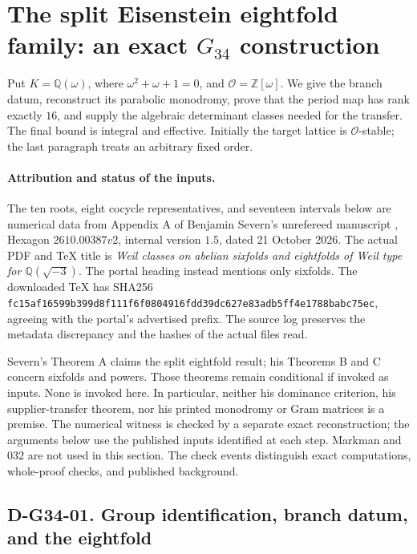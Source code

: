 \section{The split Eisenstein eightfold family: an exact \(G_{34}\) construction}
\label{sec:g34-new}

Put \(K=\mathbb Q(\omega)\), where \(\omega^2+\omega+1=0\), and
\(\mathcal O=\mathbb Z[\omega]\).  We give the branch datum, reconstruct its
parabolic monodromy, prove that the period map has rank exactly \(16\), and
supply the algebraic determinant classes needed for the transfer.  The final
bound is integral and effective.  Initially the target lattice is
\(\mathcal O\)-stable; the last paragraph treats an arbitrary fixed order.

\paragraph{Attribution and status of the inputs.}
The ten roots, eight cocycle representatives, and seventeen intervals below
are numerical data from Appendix A of Benjamin Severn's unrefereed manuscript
\cite{G34:Severn}, Hexagon \(2610.00387v2\), internal version \(1.5\), dated
21 October 2026.  The actual PDF and TeX title is \emph{Weil classes on abelian
sixfolds and eightfolds of Weil type for \(\mathbb Q(\sqrt{-3})\)}.  The portal
heading instead mentions only sixfolds.  The downloaded TeX has SHA256
\texttt{fc15af16599b399d8f111f6f0804916f}\allowbreak\texttt{dd39dc627e83adb5ff4e1788babc75ec},
agreeing with the portal's advertised prefix.  The source log preserves the
metadata discrepancy and the hashes of the actual files read.

Severn's Theorem A claims the split eightfold result; his Theorems B and C
concern sixfolds and powers.  Those theorems remain conditional if invoked as
inputs.  None is invoked here.  In particular, neither his dominance criterion,
his supplier-transfer theorem, nor his printed monodromy or Gram matrices is
a premise.  The numerical witness is checked by a separate exact reconstruction;
the arguments below use the published inputs identified at each step.
Markman and 032 are not used in this section.  The check events distinguish
exact computations, whole-proof checks, and published background.

\subsection*{D-G34-01. Group identification, branch datum, and the eightfold}


